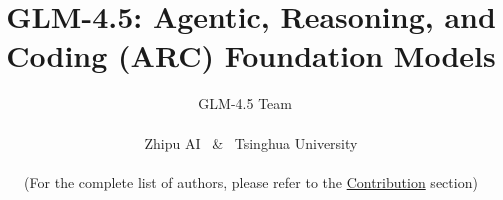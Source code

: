 \documentclass{article}
\title{GLM-4.5: Agentic, Reasoning, and Coding (ARC) Foundation Models}
\author{
{GLM-4.5 Team}
~\\\\
Zhipu AI ~\&~ Tsinghua University\\\\
(For the complete list of authors, please refer to the \hyperref[sec:contribution]{Contribution} section)
{}
}
\theoremstyle{definition}
\begin{document}
\maketitle

\vspace{-1.5em}
\begin{abstract}



\end{abstract}









\clearpage




\clearpage

%
\end{document}
